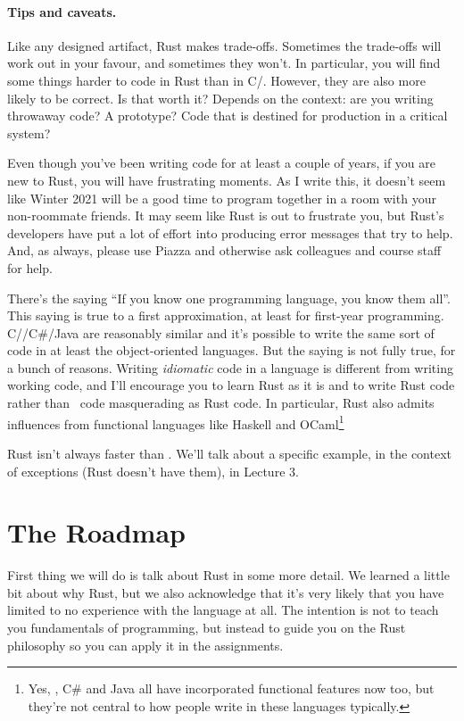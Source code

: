 \paragraph{Tips and caveats.}
Like any designed artifact, Rust makes trade-offs. Sometimes the trade-offs will work out in your favour, and sometimes they won't. In particular, you will find some things harder to code in Rust than in C/\CPP. However, they are also more likely to be correct. Is that worth it? Depends on the context: are you writing throwaway code? A prototype? Code that is destined for production in a critical system?

Even though you've been writing code for at least a couple of years, if you are new to Rust, you will have frustrating moments. As I write this, it doesn't seem like Winter 2021 will be a good time to program together in a room with your non-roommate friends. It may seem like Rust is out to frustrate you, but Rust's developers have put a lot of effort into producing error messages that try to help. And, as always, please use Piazza and otherwise ask colleagues and course staff for help.

There's the saying ``If you know one programming language, you know them all''. This saying is true to a first approximation, at least for first-year programming. C/\CPP/C\#/Java are reasonably similar and it's possible to write the same sort of code in at least the object-oriented languages. But the saying is not fully true, for a bunch of reasons. Writing \emph{idiomatic} code in a language is different from writing working code, and I'll encourage you to learn Rust as it is and to write Rust code rather than \CPP~code masquerading as Rust code. In particular, Rust also admits influences from functional languages like Haskell and OCaml\footnote{Yes, \CPP, C\# and Java all have incorporated functional features now too, but they're not central to how people write in these languages typically.}

Rust isn't always faster than \CPP. We'll talk about a specific example, in the context of exceptions (Rust doesn't have them), in Lecture 3.

\section*{The Roadmap}
First thing we will do is talk about Rust in some more detail. We learned a little bit about why Rust, but we also acknowledge that it's very likely that you have limited to no experience with the language at all. The intention is not to teach you fundamentals of programming, but instead to guide you on the Rust philosophy so you can apply it in the assignments. 

